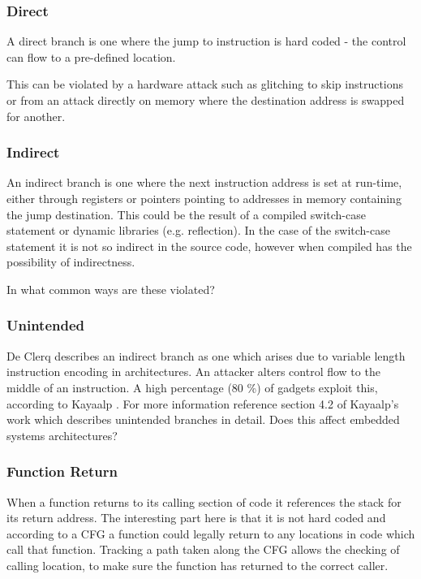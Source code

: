 \subsubsection{Direct}
A direct branch is one where the jump to instruction is hard coded - the control can flow to a pre-defined location.

This can be violated by a hardware attack such as glitching to skip instructions or from an attack directly on memory where the destination address is swapped for another.

\subsubsection{Indirect}
An indirect branch is one where the next instruction address is set at run-time, either through registers or pointers pointing to addresses in memory containing the jump destination. This could be the result of a compiled switch-case statement or dynamic libraries (e.g. reflection). In the case of the switch-case statement it is not so indirect in the source code, however when compiled has the possibility of indirectness.

In what common ways are these violated?

\subsubsection{Unintended}
De Clerq \cite{DeClercq2017} describes an indirect branch as one which arises due to variable length instruction encoding in architectures. An attacker alters control flow to the middle of an instruction. A high percentage (80 \%) of gadgets exploit this, according to Kayaalp \cite{Kayaalp2014}. For more information reference section 4.2 of Kayaalp’s work \cite{Kayaalp2014} which describes unintended branches in detail. Does this affect embedded systems architectures?

\subsubsection{Function Return}
When a function returns to its calling section of code it references the stack for its return address. The interesting part here is that it is not hard coded and according to a CFG a function could legally return to any locations in code which call that function. Tracking a path taken along the CFG allows the checking of calling location, to make sure the function has returned to the correct caller.

